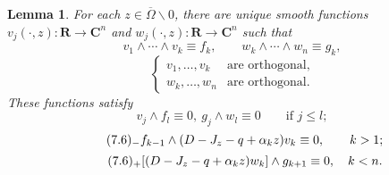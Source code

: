 \documentclass{surv-l}
\theoremstyle{plain}
\newtheorem{lemma}[theorem]{Lemma}
\theoremstyle{definition}
\numberwithin{equation}{chapter}
\begin{document}
\begin{lemma}\label{chap01:lem7.2}
For each $z\in\overline{\Omega}\backslash 0$, there are unique smooth functions $v_{j}(\cdot, z) : \mathbf{R}\rightarrow \mathbf{C}^{n}$ and $w_{j}(\cdot,z) : \mathbf{R}\rightarrow \mathbf{C}^{n}$ such that
\setcounter{equation}{2}
\begin{equation}\label{eq7.3}
v_{1}\wedge\cdots\wedge v_{k}\equiv f_{k},\qquad  w_{k}\wedge\cdots\wedge w_{n}\equiv g_{k},
\end{equation}
\begin{equation}\label{eq7.4}
\left\{\begin{array}{ll}
v_{1},\ldots, v_{k} & \text{are orthogonal},\\
w_{k},\ldots, w_{n} & \text{are orthogonal}.
\end{array}\right.
\end{equation}
These functions satisfy
\begin{equation}\label{eq7.5}
v_{j}\wedge f_{l}\equiv 0,\ g_{j}\wedge w_{l}\equiv 0\qquad \text{if } j\leq l;
\end{equation}
\begin{equation*}
\tag*{$(7.6)_{-}$}   f_{k-1}\wedge(D-J_{z}-q+\alpha_{k}z)v_{k}\equiv 0,\qquad k>1;
\end{equation*}
\begin{equation*}
\tag*{$(7.6)_{+}$} [(D-J_{z}-q+\alpha_{k}z)w_{k}]\wedge g_{k+1}\equiv 0,\quad k<n.
\end{equation*}
\end{lemma}
\end{document}
